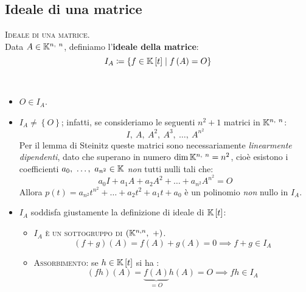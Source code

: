 \subsection{Ideale di una matrice}
\begin{define}\textsc{Ideale di una matrice.}\\
	Data $A\in\mathbb{K}^{n,\ n}$, definiamo l'\textbf{ideale della matrice}:
	\begin{equation}
		I_A\coloneqq\left\{f\in\mathbb{K}\left[t\right]\mid f\left(A\right)=O\right\}
	\end{equation}
\vspace{-6mm}
\end{define}
\begin{observe}~{}
	\begin{itemize}
		\item $O\in I_A$.
		\item $I_A\neq\left\{O\right\}$; infatti, se consideriamo le seguenti $n^2+1$ matrici in $\mathbb{K}^{n,\ n}$:
		\begin{equation*}
			I,\ A,\ A^2,\ A^3,\ \ldots,\ A^{n^2}
		\end{equation*}
	Per il lemma di Steinitz queste matrici sono necessariamente \textit{linearmente dipendenti}, dato che superano in numero $\dim \mathbb{K}^{n,\ n}=n^2$, cioè esistono i coefficienti $a_0,\ \ldots,\ a_{n^2}\in\kamp$ \textit{non} tutti nulli tali che:
	\begin{equation*}
		a_0I+a_1A+a_2A^2+\ldots+a_{n^2}A^{n^2}=O
	\end{equation*}
	Allora $p\left(t\right)=a_{n^2}t^{n^2}+\ldots+a_2t^2+a_1t+a_0$ è un polinomio \textit{non} nullo in $I_A$.
	\item $I_A$ soddisfa giustamente la definizione di ideale di $\mathbb{K}\left[t\right]$:
	\begin{itemize}
		\item \textsc{$I_A$ è un sottogruppo di $\left(\kamp^{n, n},\ +\right)$}.
		\begin{equation*}
			\left(f+g\right)\left(A\right)=f\left(A\right)+g\left(A\right)=0\implies f+g\in I_A
		\end{equation*}
		\item \textsc{Assorbimento}: se $h\in\mathbb{K}\left[t\right]$ si ha :
		\begin{equation*}
			\left(fh\right)\left(A\right)=\underbrace{f\left(A\right)}_{=O}h\left(A\right)=O\implies fh\in I_A
		\end{equation*}
	\end{itemize}
	\end{itemize}
\vspace{-3mm}
\end{observe}
